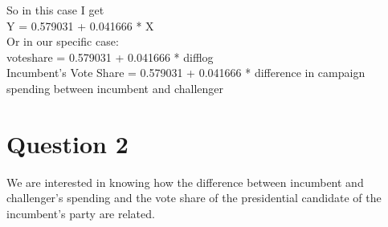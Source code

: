 \documentclass[12pt,letterpaper]{article}
\begin{document}
\begin{enumerate}
		So in this case I get \\
		Y = 0.579031 + 0.041666 * X \\
		Or in our specific case: \\
		voteshare = 0.579031 + 0.041666 * difflog \\
		Incumbent's Vote Share = 0.579031 + 0.041666 * difference in campaign spending between incumbent and challenger
	\end{enumerate}
	
\newpage

\section*{Question 2}
\noindent We are interested in knowing how the difference between incumbent and challenger's spending and the vote share of the presidential candidate of the incumbent's party are related.	\vspace{.25cm}
\end{document}
